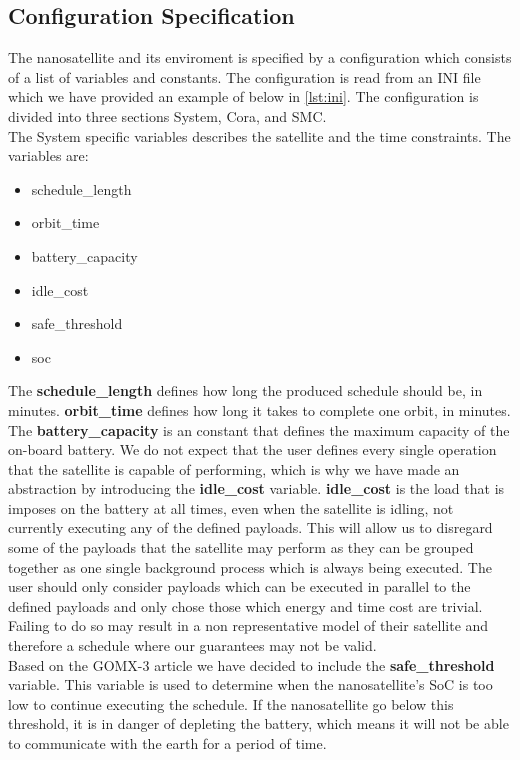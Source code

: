 \subsection{Configuration Specification} \label{subsec:init}
The nanosatellite and its enviroment is specified by a configuration which consists of a list of variables and constants. The configuration is read from an INI file which we have provided an example of below in \cref{lst:ini}.
The configuration is divided into three sections System, Cora, and SMC.\\
The System specific variables describes the satellite and the time constraints.
The variables are:
\begin{itemize}
	\item schedule_length
	\item orbit_time
	\item battery_capacity
	\item idle_cost
	\item safe_threshold
	\item soc
\end{itemize}
The \textbf{schedule\_length} defines how long the produced schedule should be, in minutes. \textbf{orbit\_time} defines how long it takes to complete one orbit, in minutes. The \textbf{battery\_capacity} is an constant that defines the maximum capacity of the on-board battery. We do not expect that the user defines every single operation that the satellite is capable of performing, which is why we have made an abstraction by introducing the \textbf{idle\_cost} variable. 
\textbf{idle\_cost} is the load that is imposes on the battery at all times, even when the satellite is idling, not currently executing any of the defined payloads.
This will allow us to disregard some of the payloads that the satellite may perform as they can be grouped together as one single background process which is always being executed.
The user should only consider payloads which can be executed in parallel to the defined payloads and only chose those which energy and time cost are trivial.
Failing to do so may result in a non representative model of their satellite and therefore a schedule where our guarantees may not be valid.\\
Based on the GOMX-3 article\cite{gomx3} we have decided to include the \textbf{safe\_threshold} variable.
This variable is used to determine when the nanosatellite's SoC is too low to continue executing the schedule.
If the nanosatellite go below this threshold, it is in danger of depleting the battery, which means it will not be able to communicate with the earth for a period of time.
